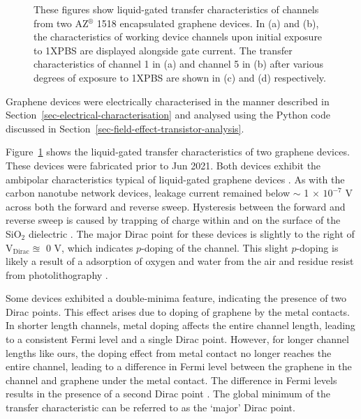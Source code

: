 \documentclass[
  a4paper,
]{scrbook}
\begin{document}
\begin{figure}
\begin{minipage}[t]{0.47\linewidth}
{{}

}

\subcaption{\label{fig-graphene-transfer-comparison-2}}
\end{minipage}%

\caption{\label{fig-pristine-graphene}These figures show liquid-gated
transfer characteristics of channels from two AZ\(^\circledR\) 1518
encapsulated graphene devices. In (a) and (b), the characteristics of
working device channels upon initial exposure to 1XPBS are displayed
alongside gate current. The transfer characteristics of channel 1 in (a)
and channel 5 in (b) after various degrees of exposure to 1XPBS are
shown in (c) and (d) respectively.}

\end{figure}

Graphene devices were electrically characterised in the manner described
in Section~\ref{sec-electrical-characterisation} and analysed using the
Python code discussed in
Section~\ref{sec-field-effect-transistor-analysis}.

Figure~\ref{fig-pristine-graphene} shows the liquid-gated transfer
characteristics of two graphene devices. These devices were fabricated
prior to Jun 2021. Both devices exhibit the ambipolar characteristics
typical of liquid-gated graphene devices
\autocite{Heller2009a,Heller2010,Xia2010,Kireev2017}. As with the carbon
nanotube network devices, leakage current remained below \(\sim\) 1
\(\times\) \(10^{-7}\) V across both the forward and reverse sweep.
Hysteresis between the forward and reverse sweep is caused by trapping
of charge within and on the surface of the SiO\(_{2}\) dielectric
\autocite{Bartolomeo2011}. The major Dirac point for these devices is
slightly to the right of V\(_{\textrm{Dirac}} \approxeq\) 0 V, which
indicates \(p\)-doping of the channel. This slight \(p\)-doping is
likely a result of a adsorption of oxygen and water from the air and
residue resist from photolithography
\autocite{Cheng2011,Shin2012,Kireev2017}.

Some devices exhibited a double-minima feature, indicating the presence
of two Dirac points. This effect arises due to doping of graphene by the
metal contacts. In shorter length channels, metal doping affects the
entire channel length, leading to a consistent Fermi level and a single
Dirac point. However, for longer channel lengths like ours, the doping
effect from metal contact no longer reaches the entire channel, leading
to a difference in Fermi level between the graphene in the channel and
graphene under the metal contact. The difference in Fermi levels results
in the presence of a second Dirac point
\autocite{Bartolomeo2011,Feng2014,Peng2018}. The global minimum of the
transfer characteristic can be referred to as the `major' Dirac point.
\end{document}
